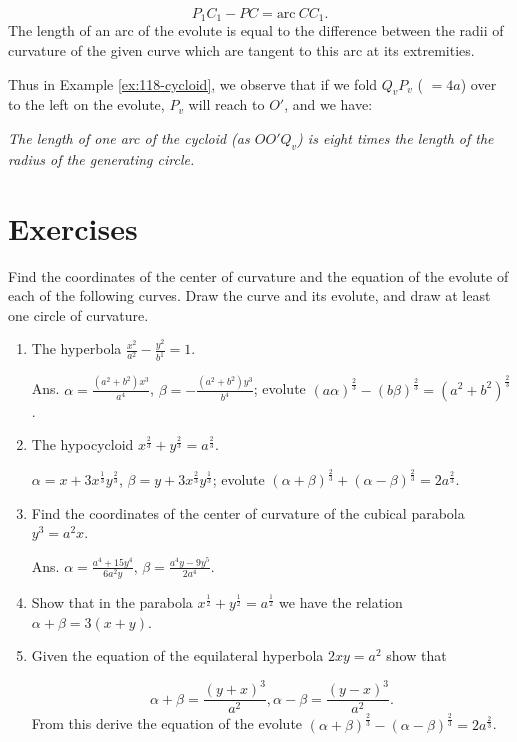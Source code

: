 \[
    P_1 C_1 - PC = \text{arc}\ CC_1.
\]
The length of an arc of the evolute is equal to the 
difference between the radii of curvature of the given curve 
which are tangent to this arc at its extremities.

Thus in Example \ref{ex:118-cycloid}, %
we observe that if we fold $Q_vP_v$ ( $= 4a$) over to the 
left on the evolute, $P_v$ will reach to $O'$, and we have:

{\it The length of one arc of the cycloid (as $OO'Q_v$) 
is eight times the length of the radius of the generating circle.
}

\section{Exercises}


Find the coordinates of the center of curvature and the 
equation of the evolute of each of the following curves. 
Draw the curve and its evolute, and draw at least one circle of curvature.

\begin{enumerate}
\item
The hyperbola $\frac{x^2}{a^2} - \frac{y^2}{b^1} = 1$. 	

Ans. 	$\alpha = \frac{(a^2 + b^2)x^3}{a^4}$, 
$\beta = -\frac{(a^2 + b^2)y^3}{b^4}$; evolute 
$(a\alpha)^{\frac{2}{3}} - (b\beta)^{\frac{2}{3}} = (a^2 + b^2)^{\frac{2}{3}}$.

\item
The hypocycloid $x^{\frac{2}{3}} + y^{\frac{2}{3}} = a^{\frac{2}{3}}$. 	  	

$\alpha = x + 3x^{\frac{1}{3}} y^{\frac{2}{3}}$, 
$\beta = y + 3 x^{\frac{2}{3}} y^{\frac{1}{3}}$;
evolute 
$(\alpha + \beta)^{\frac{2}{3}} + (\alpha - \beta)^{\frac{2}{3}} 
= 2a^{\frac{2}{3}}$.

\item
Find the coordinates of the center of curvature of the 
cubical parabola $y^3 = a^2x$.

Ans. 	
$\alpha = \frac{a^4 + 15y^4}{6a^2 y}$, 
$\beta = \frac{a^4y - 9y^5}{2a^4}$.

\item
Show that in the parabola 
$x^{\frac{1}{2}} + y^{\frac{1}{2}} = a^{\frac{1}{2}}$ we 
have the relation $\alpha + \beta = 3(x + y)$.

\item
Given the equation of the equilateral hyperbola $2xy = a^2$ show that

\[
 \alpha + \beta 
= \frac{(y + x)^3}{a^2}, \alpha - \beta = \frac{(y - x)^3}{a^2}.
\]
From this derive the equation of the evolute 
$(\alpha + \beta)^{\frac{2}{3}} - (\alpha - \beta)^{\frac{2}{3}} 
= 2 a^{\frac{2}{3}}$.
\end{enumerate}

